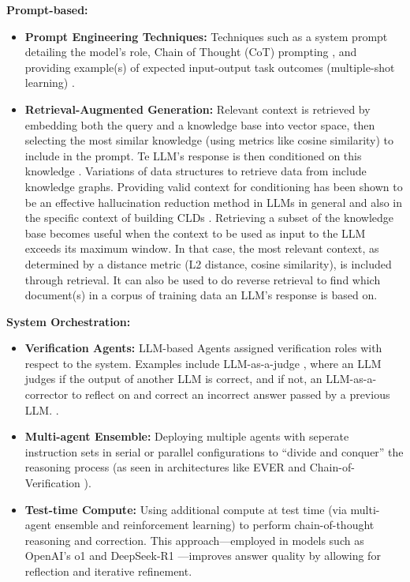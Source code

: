 \noindent\textbf{Prompt-based:}  
\begin{itemize}
    \item \textbf{Prompt Engineering Techniques:} Techniques such as a system prompt detailing the model's role, Chain of Thought (CoT) prompting \cite{wei2022chain}, and providing example(s) of expected input-output task outcomes (multiple-shot learning) \cite{brown2020language}.
    \item \textbf{Retrieval-Augmented Generation:} Relevant context is retrieved by embedding both the query and a knowledge base into vector space, then selecting the most similar knowledge (using metrics like cosine similarity) to include in the prompt. Te LLM's response is then conditioned on this knowledge \cite{lewis2020retrieval}. Variations of data structures to retrieve data from include knowledge graphs. Providing valid context for conditioning has been shown to be an effective hallucination reduction method in LLMs in general \cite{tonmoy2024comprehensive} and also in the specific context of building CLDs \cite{zhang2024causal}. Retrieving a subset of the knowledge base becomes useful when the context to be used as input to the LLM exceeds its maximum window. In that case, the most relevant context, as determined by a distance metric (L2 distance, cosine similarity), is included through retrieval. It can also be used to do reverse retrieval to find which document(s) in a corpus of training data an LLM's response is based on.
\end{itemize}

\noindent\textbf{System Orchestration:}  
\begin{itemize}
    \item \textbf{Verification Agents:} LLM-based Agents assigned verification roles with respect to the system. Examples include LLM-as-a-judge \cite{zheng2023judging}, where an LLM judges if the output of another LLM is correct, and if not, an LLM-as-a-corrector to reflect on and correct an incorrect answer passed by a previous LLM. \cite{shinn2024reflexion}. 
    \item \textbf{Multi-agent Ensemble:} Deploying multiple agents with seperate instruction sets in serial or parallel configurations to “divide and conquer” the reasoning process (as seen in architectures like EVER and Chain-of-Verification \cite{tonmoy2024comprehensive}).
    \item \textbf{Test-time Compute:} Using additional compute at test time (via multi-agent ensemble and reinforcement learning) to perform chain-of-thought reasoning and correction. This approach—employed in models such as OpenAI's o1 \cite{openai2024reasoning} and DeepSeek-R1 \cite{guo2025deepseek}—improves answer quality by allowing for reflection and iterative refinement.
\end{itemize}

